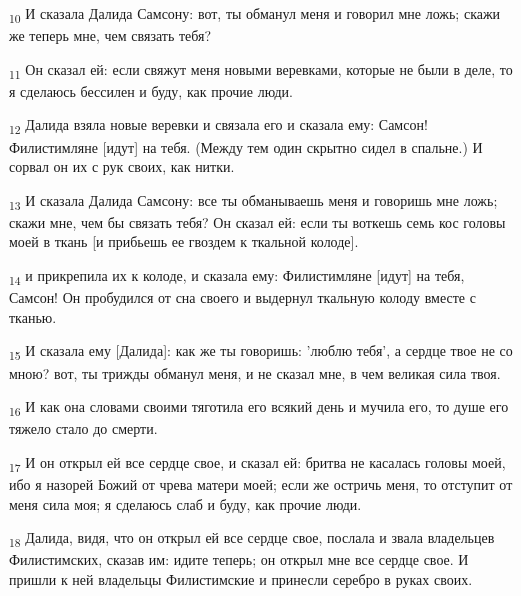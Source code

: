 \begin{tcolorbox}
\textsubscript{10} И сказала Далида Самсону: вот, ты обманул меня и говорил мне ложь; скажи же теперь мне, чем связать тебя?
\end{tcolorbox}
\begin{tcolorbox}
\textsubscript{11} Он сказал ей: если свяжут меня новыми веревками, которые не были в деле, то я сделаюсь бессилен и буду, как прочие люди.
\end{tcolorbox}
\begin{tcolorbox}
\textsubscript{12} Далида взяла новые веревки и связала его и сказала ему: Самсон! Филистимляне [идут] на тебя. (Между тем один скрытно сидел в спальне.) И сорвал он их с рук своих, как нитки.
\end{tcolorbox}
\begin{tcolorbox}
\textsubscript{13} И сказала Далида Самсону: все ты обманываешь меня и говоришь мне ложь; скажи мне, чем бы связать тебя? Он сказал ей: если ты воткешь семь кос головы моей в ткань [и прибьешь ее гвоздем к ткальной колоде].
\end{tcolorbox}
\begin{tcolorbox}
\textsubscript{14} и прикрепила их к колоде, и сказала ему: Филистимляне [идут] на тебя, Самсон! Он пробудился от сна своего и выдернул ткальную колоду вместе с тканью.
\end{tcolorbox}
\begin{tcolorbox}
\textsubscript{15} И сказала ему [Далида]: как же ты говоришь: 'люблю тебя', а сердце твое не со мною? вот, ты трижды обманул меня, и не сказал мне, в чем великая сила твоя.
\end{tcolorbox}
\begin{tcolorbox}
\textsubscript{16} И как она словами своими тяготила его всякий день и мучила его, то душе его тяжело стало до смерти.
\end{tcolorbox}
\begin{tcolorbox}
\textsubscript{17} И он открыл ей все сердце свое, и сказал ей: бритва не касалась головы моей, ибо я назорей Божий от чрева матери моей; если же остричь меня, то отступит от меня сила моя; я сделаюсь слаб и буду, как прочие люди.
\end{tcolorbox}
\begin{tcolorbox}
\textsubscript{18} Далида, видя, что он открыл ей все сердце свое, послала и звала владельцев Филистимских, сказав им: идите теперь; он открыл мне все сердце свое. И пришли к ней владельцы Филистимские и принесли серебро в руках своих.
\end{tcolorbox}
